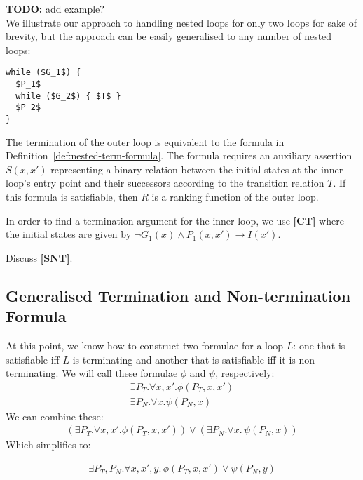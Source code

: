 \documentclass[a4paper]{llncs}
\newcommand{\todo}[1]{{\bf TODO:} #1}
\begin{document}
\todo{add example?}\\

%
We illustrate our approach to handling nested loops for only two loops for
sake of brevity, but the approach can be easily generalised to any number of
nested loops:
%
\begin{lstlisting}[mathescape=true]
while ($G_1$) { 
  $P_1$ 
  while ($G_2$) { $T$ }
  $P_2$
}
\end{lstlisting}

The termination of the outer loop is equivalent to the formula in
Definition~\ref{def:nested-term-formula}.  The formula requires an auxiliary
assertion $S(x,x')$ representing a binary relation between the initial
states at the inner loop's entry point and their successors according to the
transition relation $T$.  If this formula is satisfiable, then $R$ is a
ranking function of the outer loop.

In order to find a termination argument for the inner loop, we use {\bf [CT]} where the initial states are given by 
$\neg G_1(x) \wedge P_1(x,x') \rightarrow I(x')$.


Discuss {\bf [SNT]}.\\

\fi

\subsection{Generalised Termination and Non-termination Formula}

At this point, we know how to construct two formulae for a loop $L$: one
that is satisfiable iff $L$ is terminating and another that is satisfiable
iff it is non-terminating.  We will call these formulae $\phi$ and $\psi$,
respectively:
%
\begin{align*}
 \exists P_T . \forall x, x' . \phi(P_T, x, x') \\
 \exists P_N . \forall x . \psi(P_N, x)
\end{align*}
%
We can combine these:
%
\begin{align*}
 (\exists P_T . \forall x, x'. \phi(P_T, x, x')) \vee (\exists P_N . \forall x.\, \psi(P_N, x))
\end{align*}
%
Which simplifies to:
%
\begin{definition}
\label{def:general-termination}
\begin{align*}
 \exists P_T, P_N. \forall x, x', y.\, \phi(P_T, x, x') \vee \psi(P_N, y)
\end{align*}
\end{definition}
\end{document}
